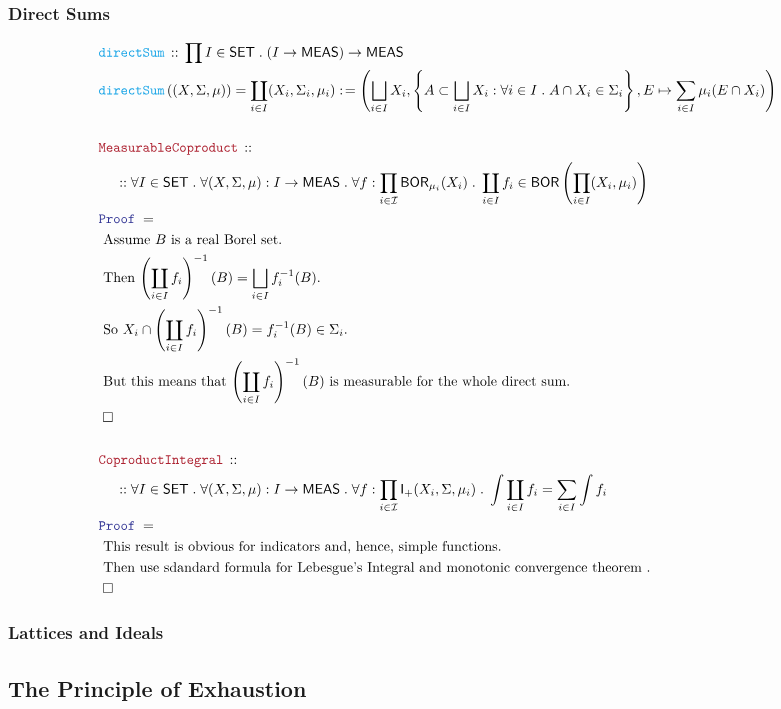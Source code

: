 \documentclass[12pt]{scrartcl}
\newcommand{\FUNC}[1]{\textcolor{Cerulean}{\mathtt{#1}}}
\newcommand{\LOGIC}[1]{\textcolor{Blue}{\mathtt{#1}}}
\newcommand{\THM}[1]{\textcolor{Maroon}{\mathtt{#1}}}
\renewcommand{\.}{\; . \;}
\newcommand{\de}{: \kern 0.1pc =}
\newcommand{\Act}[1]{\left( #1 \right)}
\newcommand{\Theorem}[2]{& \THM{#1} \, :: \, #2 \\ & \Proof = \\ }
\newcommand{\DeclareFunc}[2]{& \FUNC{#1} \, :: \, #2 \\}
\newcommand{\DefineNamedFunc}[4]{&  \FUNC{#1}\Act{#2} = #3 \de #4 \\}
\newcommand{\NewLine}{\\ & \kern 1pc}
\newcommand{\Page}[1]{ \begin{align*} #1 \end{align*}   }
\newcommand{\QED}{\; \square}
\newcommand{\EndProof}{& \QED \\}
\newcommand{\Proof}{\LOGIC{Proof} \; }
\newcommand{\Explain}[1]{& \text{#1.} \\}
\newcommand{\I}{\mathcal{I}}
\newcommand{\SET}{\mathsf{SET}}
\newcommand{\BOR}{\mathsf{BOR}}
\newcommand{\Integrable}{\mathsf{I}}
\newcommand{\MEAS}{\mathsf{MEAS}}
\begin{document}
\subsubsection{Direct Sums}
\Page{
	\DeclareFunc{directSum}{\prod I \in \SET \. (I \to \MEAS) \to \MEAS}
	\DefineNamedFunc{directSum}{(X,\Sigma,\mu)}{\coprod_{i \in I} (X_i,\Sigma_i,\mu_i)}
	{
		\left( 
			\bigsqcup_{i \in I} X_i, 
			\left\{A  \subset \bigsqcup_{i \in I} X_i : \forall i \in I \. A \cap X_i \in \Sigma_i \right\},
			E \mapsto \sum_{i \in I} \mu_i(E \cap X_i ) 
		\right)	
	}
	\\
	\Theorem{MeasurableCoproduct}
	{
		\NewLine :: 		
		\forall I \in \SET \.
		\forall (X, \Sigma, \mu) : I \to \MEAS \.
		\forall f : \prod_{i \in \I} \BOR_{\mu_i}(X_i) \.
		\coprod_{i \in I} f_i \in \BOR\left( \prod_{i \in I} (X_i,\mu_i) \right)
	}
	\Explain{ 
		Assume $B$ is a real Borel set}
	\Explain{ 
		Then $\left(\coprod_{i \in I} f_i\right)^{-1}(B) = \bigsqcup_{i \in I} f_i^{-1}(B)$}
	\Explain{
		So $X_i \cap \left(\coprod_{i \in I} f_i\right)^{-1}(B) = f_i^{-1}(B) \in \Sigma_i $}
	\Explain{
		But this means that $\left(\coprod_{i \in I} f_i\right)^{-1}(B)$ is measurable for the whole direct sum}
	\EndProof
	\\
	\Theorem{CoproductIntegral}
	{
		\NewLine :: 		
		\forall I \in \SET \.
		\forall (X, \Sigma, \mu) : I \to \MEAS \.
		\forall f : \prod_{i \in \I} \Integrable_+(X_i,\Sigma,\mu_i) \.
		\int \coprod_{i \in I} f_i = \sum_{i \in I} \int f_i 
	}
	\Explain{
		This result is obvious for indicators and, hence,  simple functions}
	\Explain{
		Then use sdandard formula for Lebesgue's Integral and monotonic convergence theorem
	}
	\EndProof
}
\newpage
\subsubsection{Lattices and Ideals}
\newpage
\subsection{The Principle of Exhaustion}
\end{document}
